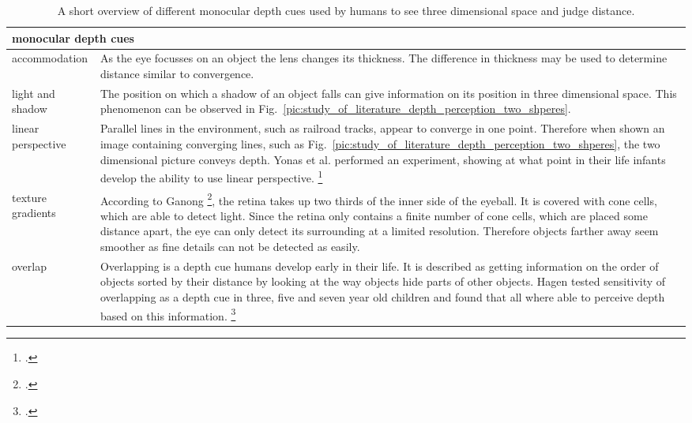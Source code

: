 \begin{table}[h!]
	\begin{tabularx}{\textwidth}{|l|X|}
		\hline
		\multicolumn{2}{|l|}{\textbf{monocular depth cues}} \\
		\hline
		accommodation & As the eye focusses on an object the lens changes its thickness. The difference in thickness may be used to determine distance similar to convergence.
		\\
		\hline
		light and shadow & The position on which a shadow of an object falls can give information on its position in three dimensional space. This phenomenon can be observed in Fig.~\ref{pic:study_of_literature_depth_perception_two_shperes}.
		\\
		\hline
		linear perspective & Parallel lines in the environment, such as railroad tracks, appear to converge in one point. Therefore when shown an image containing converging lines, such as Fig.~\ref{pic:study_of_literature_depth_perception_two_shperes}, the two dimensional picture conveys depth. Yonas et al. performed an experiment, showing at what point in their life infants develop the ability to use linear perspective.  \footcite{Yonas_Infants_distance_perception_from_linear_perspective_and_texture_gradients}
		\\
		\hline
		texture gradients & According to Ganong \footcite{Ganong_Review_of_Medical_Physiology}, the retina takes up two thirds of the inner side of the eyeball. It is covered with cone cells, which are able to detect light. Since the retina only contains a finite number of cone cells, which are placed some distance apart, the eye can only detect its surrounding at a limited resolution. Therefore objects farther away seem smoother as fine details can not be detected as easily.
		\\
		\hline
		overlap & Overlapping is a depth cue humans develop early in their life. It is described as getting information on the order of objects sorted by their distance by looking at the way objects hide parts of other objects. Hagen tested sensitivity of overlapping as a depth cue in three, five and seven year old children and found that all where able to perceive depth based on this information. \footcite{Hagen_Development_of_ability_to_perceive_and_produce_pictorial_depth_cue_of_overlapping}
		\\
		\hline
	\end{tabularx}
	\label{tab:study_of_literature_monocular_depth_cues1}
	\caption{A short overview of different monocular depth cues used by humans to see three dimensional space and judge distance.}
\end{table}



